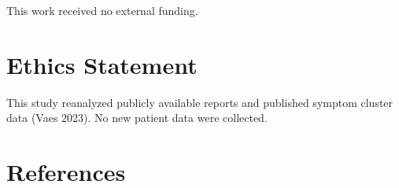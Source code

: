 \documentclass[
  letterpaper,
  DIV=11,
  numbers=noendperiod]{scrartcl}
\begin{document}
This work received no external funding.

\section*{Ethics Statement}\label{ethics-statement}

This study reanalyzed publicly available reports and published symptom
cluster data (Vaes 2023). No new patient data were collected.

\newpage{}

\section*{References}\label{references}
\end{document}
